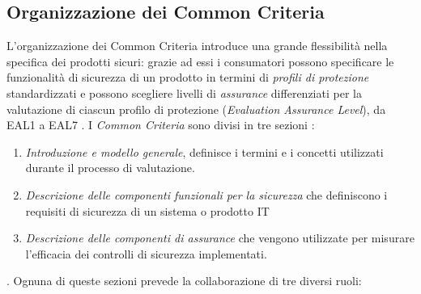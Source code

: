 \documentclass[../main.tex]{subfiles}
\begin{document}
\subsection{Organizzazione dei Common Criteria}
L'organizzazione dei Common Criteria introduce una grande flessibilità nella specifica dei prodotti sicuri: grazie ad essi i consumatori possono specificare le funzionalità di sicurezza di un prodotto in termini di \textit{profili di protezione} standardizzati e possono scegliere livelli di \textit{assurance} differenziati per la valutazione di ciascun profilo di protezione (\textit{Evaluation Assurance Level}), da EAL1 a EAL7 \cite{SyntegraCC}.
I \textit{Common Criteria} sono divisi in tre sezioni \cite{CommonCriteriaSans}:
\begin{enumerate}
\item \textit{Introduzione e modello generale}, definisce i termini e i concetti utilizzati durante il processo di valutazione.
\item \textit{Descrizione delle componenti funzionali per la sicurezza} che definiscono i requisiti di sicurezza di un sistema o prodotto IT
\item \textit{Descrizione delle componenti di \textit{assurance}} che vengono utilizzate per misurare l'efficacia dei controlli di sicurezza implementati.
\end{enumerate}.
Ognuna di queste sezioni prevede la collaborazione di tre diversi ruoli:
\end{document}
